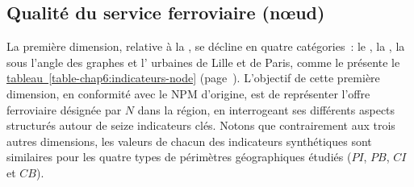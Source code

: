 \begin{refsegment}
\subsection{Qualité du service ferroviaire (nœud)
    \label{chap6:methodologie-indicateurs-node}
    }

La première dimension, relative à la , se décline en quatre catégories~: le , la , la  sous l'angle des graphes et l' urbaines de Lille et de Paris, comme le présente le \hyperref[table-chap6:indicateurs-node]{tableau~\ref{table-chap6:indicateurs-node}} (page~\pageref{table-chap6:indicateurs-node}). L'objectif de cette première dimension, en conformité avec le \acrshort{NPM} d'origine, est de représenter l'offre ferroviaire désignée par \(N\) dans la région, en interrogeant ses différents aspects structurés autour de seize indicateurs clés. Notons que contrairement aux trois autres dimensions, les valeurs de chacun des indicateurs synthétiques sont similaires pour les quatre types de périmètres géographiques étudiés (\(PI\), \(PB\), \(CI\) et \(CB\)).%


\end{refsegment}
